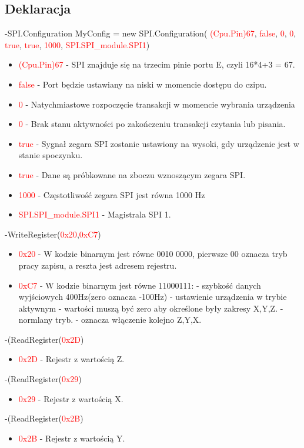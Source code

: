\documentclass{article}
\begin{document}
\subsection{Deklaracja}
-SPI.Configuration MyConfig =
new SPI.Configuration(\space \textcolor{red}{ (Cpu.Pin)67},\space \textcolor{red}{ false},\space \textcolor{red}{ 0}, \space \textcolor{red}{ 0},\space \textcolor{red}{ true},\space \textcolor{red}{ true},\space \textcolor{red}{ 1000},\space \textcolor{red}{ SPI.SPI\_module.SPI1})
\begin{itemize}
\item \textcolor{red}{(Cpu.Pin)67} - SPI znajduje się na trzecim pinie portu E, czyli 16*4+3 = 67.
\item \textcolor{red}{false} - Port będzie ustawiany na niski w momencie dostępu do czipu.
\item \textcolor{red}{0} - Natychmiastowe rozpoczęcie transakcji w momencie wybrania urządzenia
\item \textcolor{red}{0} - Brak stanu aktywności po zakończeniu transakcji czytania lub pisania.
\item \textcolor{red}{true} - Sygnał zegara SPI zostanie ustawiony na wysoki, gdy urządzenie jest w stanie spoczynku.
\item \textcolor{red}{true} -  Dane są próbkowane na zboczu wznoszącym zegara SPI.
\item \textcolor{red}{1000} -  Częstotliwość zegara SPI jest równa 1000 Hz
\item \textcolor{red}{SPI.SPI\_module.SPI1} - Magistrala SPI 1. 
\end{itemize}
-WriteRegister(\space \textcolor{red}{0x20},\space \textcolor{red}{0xC7})
\begin{itemize}
\item \textcolor{red}{0x20} -  W kodzie binarnym jest równe 0010 0000, pierwsze 00 oznacza tryb pracy zapisu, a reszta jest adresem rejestru.
\item \textcolor{red}{0xC7} -  W kodzie binarnym jest równe 11000111: 
 - szybkość danych wyjściowych 400Hz(zero oznacza -100Hz)
 - ustawienie urządzenia w trybie aktywnym
 - wartości muszą być zero aby określone były zakresy X,Y,Z.
 - normlany tryb.
 - oznacza włączenie kolejno Z,Y,X.
\end{itemize}
-(ReadRegister(\textcolor{red}{0x2D})
\begin{itemize}
\item \textcolor{red}{0x2D } - Rejestr z wartością Z.
\end{itemize}
-(ReadRegister(\textcolor{red}{0x29})
\begin{itemize}
\item \textcolor{red}{ 0x29 } - Rejestr z wartością X.
\end{itemize}
-(ReadRegister(\textcolor{red}{0x2B})
\begin{itemize}
\item \textcolor{red}{ 0x2B } - Rejestr z wartością Y.
\end{itemize}
\end{document}
